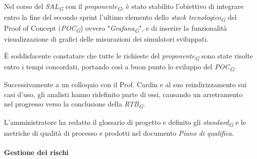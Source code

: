 Nel corso del \textit{SAL}\textsubscript{\textit{G}} con il \textit{proponente}\textsubscript{\textit{G}}, è stato stabilito l'obiettivo di integrare entro la fine del secondo sprint l'ultimo elemento dello \textit{stack tecnologico}\textsubscript{\textit{G}} del Proof of Concept (\textit{POC}\textsubscript{\textit{G}}) ovvero "\textit{Grafana}\textsubscript{\textit{G}}", e di inserire la funzionalità visualizzazione di grafici delle misurazioni dei simulatori sviluppati.

\vspace{0.2cm}

È soddisfacente constatare che tutte le richieste del \textit{proponente}\textsubscript{\textit{G}} sono state risolte entro i tempi concordati, portando così a buon punto lo sviluppo del \textit{POC}\textsubscript{\textit{G}}.

Successivamente a un colloquio con il Prof. Cardin e al suo reindirizzamento sui casi d'uso, gli analisti hanno ridefinito parte di essi, causando un arretramento nel progresso verso la conclusione della \textit{RTB}\textsubscript{\textit{G}}.

\vspace{0.2cm}

L'amministratore ha redatto il glossario di progetto e definito gli \textit{standard}\textsubscript{\textit{G}} e le metriche di qualità di processo e prodotti nel documento \textit{Piano di qualifica}.

\paragraph{Gestione dei rischi} 

